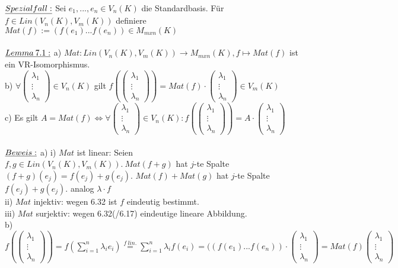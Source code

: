\documentclass[fleqn, a4paper, 11pt]{article}
\begin{document}
$\uline{Spezialfall:}$ Sei $e_1,...,e_n\in V_n(K)$ die Standardbasis. F\"ur $f\in Lin(V_n(K),V_m(K))$ definiere $Mat(f):=(f(e_1)...f(e_n))\in M_{mxn}(K)$\\
\\
$\uline{Lemma\:7.1:}$ a) $Mat:Lin(V_n(K),V_m(K))\rightarrow M_{mxn}(K),f\mapsto Mat(f)$ ist ein VR-Isomorphismus.\\
b) $\forall\begin{pmatrix}
	\lambda_1\\
	\vdots\\
	\lambda_n
\end{pmatrix}\in V_n(K)$ gilt $f(\begin{pmatrix}
	\lambda_1\\
	\vdots\\
	\lambda_n
\end{pmatrix})=Mat(f)\cdot\begin{pmatrix}
	\lambda_1\\
	\vdots\\
	\lambda_n
\end{pmatrix}\in V_m(K)$\\
c) Es gilt $A=Mat(f)\Leftrightarrow\forall\begin{pmatrix}
	\lambda_1\\
	\vdots\\
	\lambda_n
\end{pmatrix}\in V_n(K):f(\begin{pmatrix}
	\lambda_1\\
	\vdots\\
	\lambda_n
\end{pmatrix})=A\cdot\begin{pmatrix}
	\lambda_1\\
	\vdots\\
	\lambda_n
\end{pmatrix}$\\
\\
$\uline{Beweis:}$ a) i) $Mat$ ist linear: Seien $f,g\in Lin(V_n(K),V_m(K)).\:Mat(f+g)$ hat $j$-te Spalte $(f+g)(e_j)=f(e_j)+g(e_j)$. $Mat(f)+Mat(g)$ hat $j$-te Spalte $f(e_j)+g(e_j)$. analog $\lambda\cdot f$\\
ii) $Mat$ injektiv: wegen 6.32 ist $f$ eindeutig bestimmt.\\
iii) $Mat$ surjektiv: wegen 6.32(/6.17) eindeutige lineare Abbildung.\\
b) $f(\begin{pmatrix}
	\lambda_1\\
	\vdots\\
	\lambda_n
\end{pmatrix})=f(\sum\limits_{i=1}^n\lambda_i e_i)\stackrel{f\:lin.}{=}\sum\limits_{i=1}^n\lambda_i f(e_i)=((f(e_1)...f(e_n))\cdot\begin{pmatrix}
	\lambda_1\\
	\vdots\\
	\lambda_n
\end{pmatrix}=Mat(f)\begin{pmatrix}
	\lambda_1\\
	\vdots\\
	\lambda_n
\end{pmatrix}$\\
\end{document}
